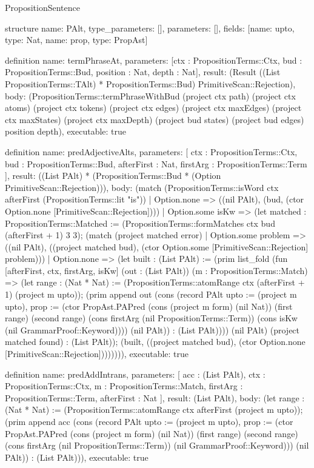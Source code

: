 \begin{lexlean}{PropositionSentence}
\begin{semanticmodule}
structure{
  name: PAlt,
  type_parameters: [],
  parameters: [],
  fields: [{name: upto, type: Nat}, {name: prop, type: PropAst}]
}

definition{
  name: termPhraseAt,
  parameters: [ctx : PropositionTerms::Ctx, bud : PropositionTerms::Bud, position : Nat, depth : Nat],
  result: (Result ((List PropositionTerms::TAlt) * PropositionTerms::Bud) PrimitiveScan::Rejection),
  body: (PropositionTerms::termPhraseWithBud (project ctx path) (project ctx atoms) (project ctx tokens) (project ctx edges) (project ctx maxEdges) (project ctx maxStates) (project ctx maxDepth) (project bud states) (project bud edges) position depth),
  executable: true
}

definition{
  name: predAdjectiveAlts,
  parameters: [
    ctx : PropositionTerms::Ctx,
    bud : PropositionTerms::Bud,
    afterFirst : Nat,
    firstArg : PropositionTerms::Term
  ],
  result: ((List PAlt) * (PropositionTerms::Bud * (Option PrimitiveScan::Rejection))),
  body: (match (PropositionTerms::isWord ctx afterFirst (PropositionTerms::lit "is"))
    | Option.none => ((nil PAlt), (bud, (ctor Option.none [PrimitiveScan::Rejection])))
    | Option.some isKw => (let matched : PropositionTerms::Matched := (PropositionTerms::formMatches ctx bud (afterFirst + 1) 3 3); (match (project matched error)
      | Option.some problem => ((nil PAlt), ((project matched bud), (ctor Option.some [PrimitiveScan::Rejection] problem)))
      | Option.none => (let built : (List PAlt) := (prim list_fold (fun [afterFirst, ctx, firstArg, isKw] (out : (List PAlt)) (m : PropositionTerms::Match) => (let range : (Nat * Nat) := (PropositionTerms::atomRange ctx (afterFirst + 1) (project m upto)); (prim append out (cons (record PAlt {upto := (project m upto), prop := (ctor PropAst.PAPred (cons (project m form) (nil Nat)) (first range) (second range) (cons firstArg (nil PropositionTerms::Term)) (cons isKw (nil GrammarProof::Keyword)))}) (nil PAlt)) : (List PAlt)))) (nil PAlt) (project matched found) : (List PAlt)); (built, ((project matched bud), (ctor Option.none [PrimitiveScan::Rejection]))))))),
  executable: true
}

definition{
  name: predAddIntrans,
  parameters: [
    acc : (List PAlt),
    ctx : PropositionTerms::Ctx,
    m : PropositionTerms::Match,
    firstArg : PropositionTerms::Term,
    afterFirst : Nat
  ],
  result: (List PAlt),
  body: (let range : (Nat * Nat) := (PropositionTerms::atomRange ctx afterFirst (project m upto)); (prim append acc (cons (record PAlt {upto := (project m upto), prop := (ctor PropAst.PAPred (cons (project m form) (nil Nat)) (first range) (second range) (cons firstArg (nil PropositionTerms::Term)) (nil GrammarProof::Keyword))}) (nil PAlt)) : (List PAlt))),
  executable: true
}


\end{semanticmodule}
\end{lexlean}
